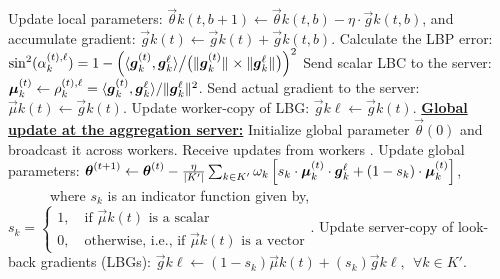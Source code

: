 \begin{algorithm}[h!]
{\begin{algorithmic}[1]
        \State Update local parameters: $\vec{\theta}{k}{(t, b+1)} \leftarrow \vec{\theta}{k}{(t, b)} - \eta \cdot \vec{g}{k}{(t, b)}$, and accumulate gradient: $\vec{g}{k}{(t)} \leftarrow \vec{g}{k}{(t)} + \vec{g}{k}{(t,b)}$.
    \EndFor
        \State Calculate the LBP error:  $ \sin^2(\alpha_{k}^{(t), \ell}) = 1 - \left( \langle  \boldsymbol{g}_{k}^{(t)} ,  \boldsymbol{g}_{k}^{\ell} \rangle  \big/ \big(\Vert  \boldsymbol{g}_{k}^{(t)} \Vert_{} \times \Vert  \boldsymbol{g}_{k}^{\ell} \Vert_{} \big) \right)^2$ \label{line:lbp}
     \label{line:lbp_cond} 
        \State Send scalar LBC to the server: $\boldsymbol{\mu}_{k}^{(t)} \leftarrow \rho_{k}^{(t),\ell} = \langle  \boldsymbol{g}_{k}^{(t)} ,  \boldsymbol{g}_{k}^{\ell}  \rangle/\Vert  \boldsymbol{g}_{k}^{\ell} \Vert_{}^2$.
    \Else {}
        \State Send actual gradient to the server: $\vec{\mu}{k}{(t)} \leftarrow \vec{g}{k}{(t)}$. \label{line:update1}
        \State Update worker-copy of LBG: $\vec{g}{k}{\ell} \leftarrow \vec{g}{k}{(t)}$. \label{line:update2}
    \EndIf
    \Statex \textbf{\underline{Global update at the aggregation server:}}
    \State Initialize global parameter $\vec{\theta}{}{(0)}$ and broadcast it across workers.
        \State {} \label{line:start_agg}
        \State Receive updates from workers .
        \State Update global parameters: $\boldsymbol{\theta}_{}^{(t+1)} \leftarrow \boldsymbol{\theta}_{}^{(t)} - \frac{\eta}{{\color{black}{\left|K'\right|{}}}} \sum_{k \in K'}\omega_k \left[ s_k \cdot  \boldsymbol{\mu}_{k}^{(t)} \cdot \boldsymbol{g}_{k}^{\ell} + (1-s_k)\cdot \boldsymbol{\mu}_{k}^{(t)}\right]$, \label{line:end_agg}
        \Statex ~~~~~~where $s_k$ is an indicator function given by, $s_k = \begin{cases} 1, \quad \text{if } 
        \vec{\mu}{k}{(t)}\text{ is a scalar} \\
        0, \quad \text{otherwise, i.e., if }\vec{\mu}{k}{(t)}\text{ is a vector} \end{cases}$.
        \State Update server-copy of look-back gradients (LBGs): $ \vec{g}{k}{\ell} \leftarrow (1-s_k) \vec{\mu}{k}{(t)} + (s_k) \vec{g}{k}{\ell },~~\forall k \in K'$.
    \EndFor
\end{algorithmic}
}
\end{algorithm}




